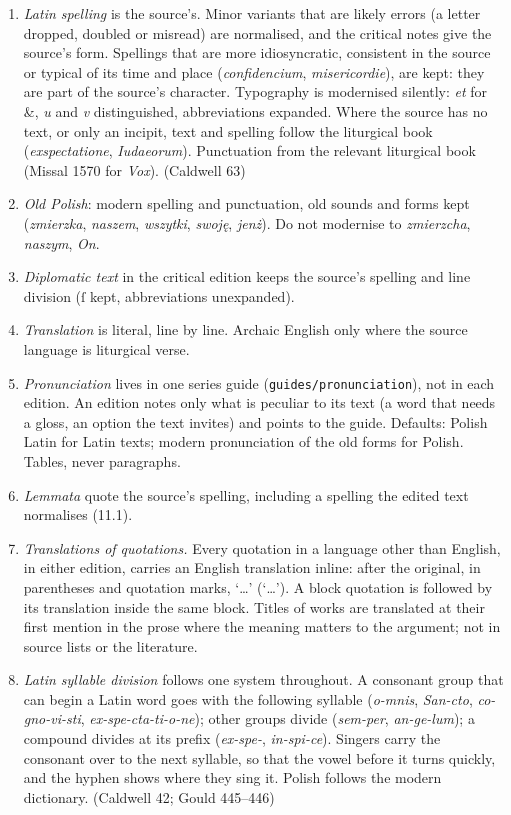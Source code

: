 \begin{enumerate}

\tightlist
\item
  \textit{Latin spelling} is the source's. Minor variants that are likely errors (a letter dropped, doubled or misread) are normalised, and the critical notes give the source's form. Spellings that are more idiosyncratic, consistent in the source or typical of its time and place (\emph{confidencium}, \emph{misericordie}), are kept: they are part of the source's character. Typography is modernised silently: \emph{et} for \&, \emph{u} and \emph{v} distinguished, abbreviations expanded. Where the source has no text, or only an incipit, text and spelling follow the liturgical book (\emph{exspectatione}, \emph{Iudaeorum}). Punctuation from the relevant liturgical book (Missal 1570 for \emph{Vox}). (Caldwell 63)
\item
  \textit{Old Polish}: modern spelling and punctuation, old sounds and forms kept (\emph{zmierzka}, \emph{naszem}, \emph{wszytki}, \emph{swoję}, \emph{jenż}). Do not modernise to \emph{zmierzcha}, \emph{naszym}, \emph{On}.
\item
  \textit{Diplomatic text} in the critical edition keeps the source's spelling and line division (ſ kept, abbreviations unexpanded).
\item
  \textit{Translation} is literal, line by line. Archaic English only where the source language is liturgical verse.
\item
  \textit{Pronunciation} lives in one series guide (\texttt{guides/pronunciation}), not in each edition. An edition notes only what is peculiar to its text (a word that needs a gloss, an option the text invites) and points to the guide. Defaults: Polish Latin for Latin texts; modern pronunciation of the old forms for Polish. Tables, never paragraphs.
\item
  \textit{Lemmata} quote the source's spelling, including a spelling the edited text normalises (11.1).
\item
  \textit{Translations of quotations.} Every quotation in a language other than English, in either edition, carries an English translation inline: after the original, in parentheses and quotation marks, `\ldots{}' (`\ldots{}'). A block quotation is followed by its translation inside the same block. Titles of works are translated at their first mention in the prose where the meaning matters to the argument; not in source lists or the literature.
\item
  \textit{Latin syllable division} follows one system throughout. A consonant group that can begin a Latin word goes with the following syllable (\emph{o-mnis}, \emph{San-cto}, \emph{co-gno-vi-sti}, \emph{ex-spe-cta-ti-o-ne}); other groups divide (\emph{sem-per}, \emph{an-ge-lum}); a compound divides at its prefix (\emph{ex-spe-}, \emph{in-spi-ce}). Singers carry the consonant over to the next syllable, so that the vowel before it turns quickly, and the hyphen shows where they sing it. Polish follows the modern dictionary. (Caldwell 42; Gould 445--446)

\end{enumerate}
